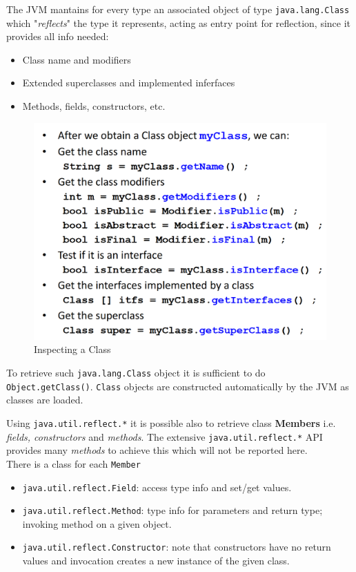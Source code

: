 \begin{paracol}{2}
    \colfill
    {The JVM mantains for every type an associated object of type \lstinline{java.lang.Class} which "\textit{reflects}" the type it represents,
    acting as entry point for reflection,
    since it provides all info needed:\ns
    \begin{itemize}
        \item Class name and modifiers
        \item Extended superclasses and implemented inferfaces
        \item Methods, fields, constructors, etc.
    \end{itemize}
    }
    \colfill

    \switchcolumn

    \begin{figure}[htbp]
        \centering
        \includegraphics{images/reflection_class.png}
        \caption{Inspecting a Class}
        \label{fig:reflection_class}
    \end{figure}

\end{paracol}

To retrieve such \lstinline{java.lang.Class} object it is sufficient to do \lstinline{Object.getClass()}.
\lstinline{Class} objects are constructed automatically by the JVM as classes are loaded.

Using \lstinline{java.util.reflect.*} it is possible also to retrieve class \textbf{Members} i.e. \textit{fields, constructors} and \textit{methods}.
The extensive \lstinline{java.util.reflect.*} API provides many \textit{methods} to achieve this which will not be reported here.\\
There is a class for each \texttt{Member}
\begin{itemize}
    \item \lstinline{java.util.reflect.Field}: access type info and set/get values.
    \item \lstinline{java.util.reflect.Method}: type info for parameters and return type;
    invoking method on a given object.
    \item \lstinline{java.util.reflect.Constructor}: note that constructors have no return values and invocation creates a new instance of the given class.
\end{itemize}


